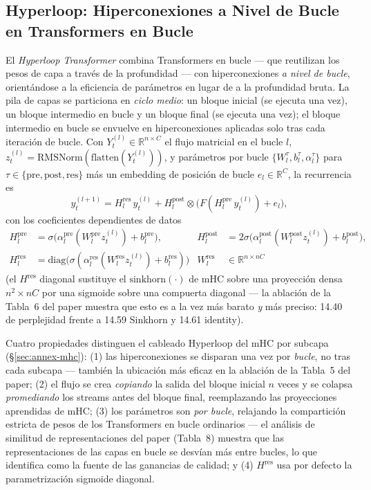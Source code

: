 \subsection{Hyperloop: Hiperconexiones a Nivel de Bucle en Transformers en Bucle}

\label{sec:annex-hyperloop-es}

El \emph{Hyperloop Transformer} \citep{zeitoun_hyperloop_2026} combina
Transformers en bucle --- que reutilizan los pesos de capa a través de la
profundidad --- con hiperconexiones \emph{a nivel de bucle}, orientándose a la
eficiencia de parámetros en lugar de a la profundidad bruta. La pila de capas
se particiona en \emph{ciclo medio}: un bloque inicial (se ejecuta una vez),
un bloque intermedio en bucle y un bloque final (se ejecuta una vez); el
bloque intermedio en bucle se envuelve en hiperconexiones aplicadas solo tras
cada iteración de bucle. Con $Y^{(l)}_t \in \mathbb{R}^{n \times C}$ el flujo
matricial en el bucle $l$, $z^{(l)}_t =
\mathrm{RMSNorm}(\mathrm{flatten}(Y^{(l)}_t))$, y parámetros por bucle
$\{W^{\tau}_l, b^{\tau}_l, \alpha^{\tau}_l\}$ para $\tau \in
\{\text{pre}, \text{post}, \text{res}\}$ más un embedding de posición de
bucle $e_l \in \mathbb{R}^C$, la recurrencia es
\begin{equation}
y^{(l+1)}_t = H^{\text{res}}_l\, y^{(l)}_t + H^{\text{post}}_l \otimes
\bigl( F(H^{\text{pre}}_l\, y^{(l)}_t) + e_l \bigr),
\end{equation}
con los coeficientes dependientes de datos
\begin{align*}
H^{\text{pre}}_l &= \sigma\bigl(\alpha^{\text{pre}}_l (W^{\text{pre}}_l z^{(l)}_t) + b^{\text{pre}}_l\bigr), &
H^{\text{post}}_l &= 2\sigma\bigl(\alpha^{\text{post}}_l (W^{\text{post}}_l z^{(l)}_t) + b^{\text{post}}_l\bigr),\\
H^{\text{res}}_l &= \mathrm{diag}\bigl(\sigma(\alpha^{\text{res}}_l (W^{\text{res}}_l z^{(l)}_t) + b^{\text{res}}_l)\bigr) &
W^{\text{res}}_l &\in \mathbb{R}^{n \times nC}
\end{align*}
(el $H^{\text{res}}$ diagonal sustituye el $\mathrm{sinkhorn}(\cdot)$ de mHC
sobre una proyección densa $n^2 \times nC$ por una sigmoide sobre una
compuerta diagonal --- la ablación de la Tabla~6 del paper muestra que esto es
a la vez más barato \emph{y} más preciso: 14.40 de perplejidad frente a 14.59
Sinkhorn y 14.61 identity).

Cuatro propiedades distinguen el cableado Hyperloop del mHC por subcapa
(\S\ref{sec:annex-mhc}): (1) las hiperconexiones se disparan una vez por
\emph{bucle}, no tras cada subcapa --- también la ubicación más eficaz en la
ablación de la Tabla~5 del paper; (2) el flujo se crea \emph{copiando} la
salida del bloque inicial $n$ veces y se colapsa \emph{promediando} los
streams antes del bloque final, reemplazando las proyecciones aprendidas de
mHC; (3) los parámetros son \emph{por bucle}, relajando la compartición
estricta de pesos de los Transformers en bucle ordinarios --- el análisis de
similitud de representaciones del paper (Tabla~8) muestra que las
representaciones de las capas en bucle se desvían más entre bucles, lo que
identifica como la fuente de las ganancias de calidad; y (4) $H^{\text{res}}$
usa por defecto la parametrización sigmoide diagonal.

